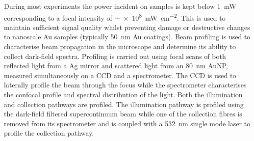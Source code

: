 \documentclass{article}
\begin{document}
During most experiments the power incident on samples is kept below \SI{1}{mW} corresponding to a focal intensity of $\sim$\SI{e8}{\milli\watt\per\centi\metre\squared}. This is used to maintain sufficient signal quality whilst preventing damage or destructive changes to nanoscale Au samples (typically \SI{50}{nm} Au coatings).
Beam profiling is used to characterise beam propagation in the microscope and determine its ability to collect dark-field spectra. Profiling is carried out using focal scans of both reflected light from a Ag mirror and scattered light from an \SI{80}{nm} AuNP, measured simultaneously on a CCD and a spectrometer. The CCD is used to laterally profile the beam through the focus while the spectrometer characterises the confocal profile and spectral distribution of the light. Both the illumination and collection pathways are profiled. The illumination pathway is profiled using the dark-field filtered supercontinuum beam while one of the collection fibres is removed from its spectrometer and is coupled with a \SI{532}{nm} single mode laser to profile the collection pathway.
\end{document}
